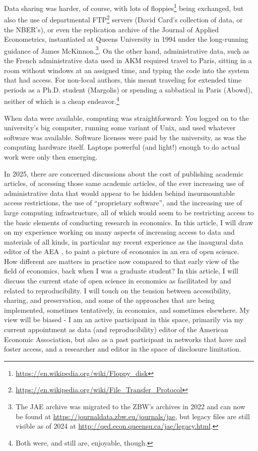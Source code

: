 \documentclass{article}
\begin{document}
Data sharing was harder, of course, with lots of floppies\footnote{\url{https://en.wikipedia.org/wiki/Floppy_disk}} being exchanged, but also the use of departmental FTP\footnote{\url{https://en.wikipedia.org/wiki/File_Transfer_Protocol}} servers (David Card's collection of data, or the NBER's), or even the replication archive of the Journal of Applied Econometrics, instantiated at Queens University in 1994 under the long-running guidance of James McKinnon.\footnote{The JAE archive was migrated to the ZBW's archives in 2022 and can now be found at \url{https://journaldata.zbw.eu/journals/jae}, but legacy files are still visible as of 2024 at \url{http://qed.econ.queensu.ca/jae/legacy.html}.}. On the other hand, administrative data, such as the French administrative data used in AKM required travel to Paris, sitting in a room without windows at an assigned time, and typing the code into the system that had access. For non-local authors, this meant traveling for extended time periods as a Ph.D. student (Margolis) or spending a sabbatical in Paris (Abowd), neither of which is a cheap endeavor.\footnote{Both were, and still are, enjoyable, though.}

When data were available, computing was straightforward: You logged on to the university's big computer, running some variant of Unix, and used whatever software was available. Software licenses were paid by the university, as was the computing hardware itself. Laptops powerful (and light!) enough to do actual work were only then emerging. 

In 2025, there are concerned discussions about the cost of publishing academic articles, of accessing those same academic articles, of the ever increasing use of administrative data \citep{card_expanding_2010,card_expanding_2010-1,chetty_time_2012,einav_economics_2014} that would appear to be hidden behind insurmountable access restrictions,  the use of ``proprietary software'', and the increasing use of large computing infrastructure, all of which would seem to be restricting access to the basic elements of conducting research in economics. In this article, I will draw on my experience working on many aspects of increasing access to data and materials of all kinds, in particular my recent experience as the inaugural data editor of the \ac{AEA} \citep{10.1257/pandp.108.745}, to paint a picture of economics in an era of open science. How different are matters in practice now compared to that early view of the field of economics, back when I was a graduate student?
%
In this article, I will discuss the current state of open science in economics as facilitated by and related to reproducibility. I will touch on the tension between accessibility, sharing, and preservation, and some of the approaches that are being implemented, sometimes tentatively, in economics, and sometimes elsewhere. My view will be biased - I am an active participant in this space, primarily via my current appointment as data (and reproducibility) editor of the American Economic Association, but also as a past participant in networks that have and foster access, and a researcher and editor in the space of disclosure limitation.
\end{document}
